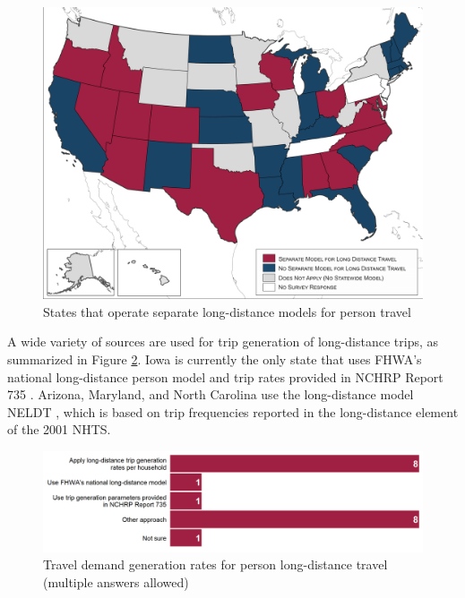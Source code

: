 \begin{figure}   %
\centering
\includegraphics[width=6.4in]{graphics/17-person-long-distance-states}
\caption{States that operate separate long-distance models for person travel}
\label{fig:person-long-distance-states}
\end{figure}

A wide variety of sources are used for trip generation of long-distance trips, as summarized in Figure \ref{fig:person-long-distance-generation}. Iowa is currently the only state that uses FHWA's national long-distance person model \citep{outwater14, outwater15} and trip rates provided in NCHRP Report 735 \citep{schiffer12}. Arizona, Maryland, and North Carolina use the long-distance model NELDT \citep{moeckel11}, which is based on trip frequencies reported in the long-distance element of the 2001 NHTS.

\begin{figure}   %
\centering
\includegraphics[width=6.4in]{graphics/18-person-long-distance-generation}
\caption[Travel demand generation rates for person long-distance travel]{Travel demand generation rates for person long-distance travel (multiple answers allowed)}
\label{fig:person-long-distance-generation}
\end{figure}

